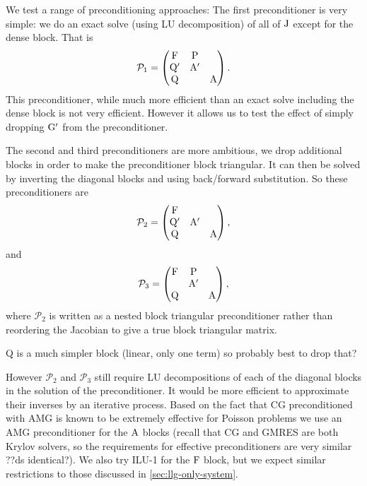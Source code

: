 \newcommand{\prcd}{\mathcal{P}}

We test a range of preconditioning approaches:
The first preconditioner is very simple: we do an exact solve (using LU decomposition) of all of $\mathrm{J}$ except for the dense block.
That is
\begin{equation}
  \prcd_{1} = 
  \begin{pmatrix}
    \Fm       & \Pm     &  \\
    \Qm'       & \Am'    &   \\
    \Qm       &         &   \Am
  \end{pmatrix}.
\end{equation}
This preconditioner, while much more efficient than an exact solve including the dense block is not very efficient.
However it allows us to test the effect of simply dropping $\mathrm{G}'$ from the preconditioner.

The second and third preconditioners are more ambitious, we drop additional blocks in order to make the preconditioner block triangular.
It can then be solved by inverting the diagonal blocks and using back/forward substitution.
So these preconditioners are
\begin{equation}
  \prcd_{2} = 
  \begin{pmatrix}
    \Fm       &           &  \\
    \Qm'       & \Am'&   \\
    \Qm       &           &   \Am
  \end{pmatrix},
\end{equation}
and
\begin{equation}
  \prcd_{3} = 
  \begin{pmatrix}
    \Fm       & \Pm       &  \\
    & \Am' &   \\
    \Qm       &           &   \Am
  \end{pmatrix},
\end{equation}
where $\prcd_{2}$ is written as a nested block triangular preconditioner rather than reordering the Jacobian to give a true block triangular matrix.

Q is a much simpler block (linear, only one term) so probably best to drop that?


However $\prcd_2$ and $\prcd_3$ still require LU decompositions of each of the diagonal blocks in the solution of the preconditioner.
It would be more efficient to approximate their inverses by an iterative process.
Based on the fact that CG preconditioned with AMG is known to be extremely effective for Poisson problems we use an AMG preconditioner for the $\mathrm{A}$ blocks (recall that CG and GMRES are both Krylov solvers, so the requirements for effective preconditioners are very similar ??ds identical?).
We also try ILU-1 for the $\mathrm{F}$ block, but we expect similar restrictions to those discussed in \cref{sec:llg-only-system}.



